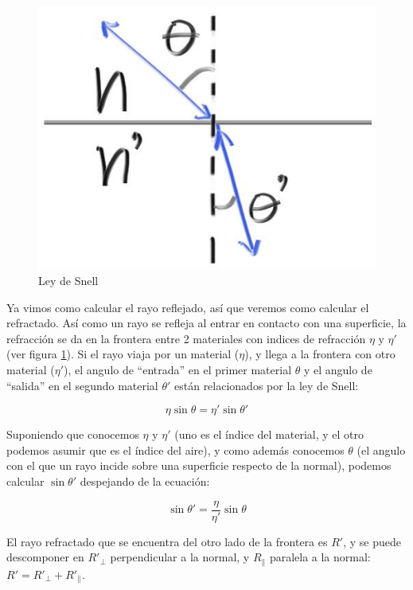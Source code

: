 \begin{figure}
    \centering
    \includegraphics[width=.7\textwidth]{imgs/refraction.jpg}
    \caption{Ley de Snell}
    \label{fig:snell-law}
\end{figure}

Ya vimos como calcular el rayo reflejado, así que veremos como calcular el
refractado. Así como un rayo se refleja al entrar en contacto con una
superficie, la refracción se da en la frontera entre 2 materiales con indices de
refracción $\eta$ y $\eta'$ (ver figura \ref{fig:snell-law}). Si el rayo viaja
por un material ($\eta$), y llega a la frontera con otro material ($\eta'$), el
angulo de ``entrada'' en el primer material $\theta$ y el angulo de ``salida'' en el
segundo material $\theta'$ están relacionados por la ley de Snell:

\[
    \eta \sin \theta = \eta' \sin \theta'
\]

Suponiendo que conocemos $\eta$ y $\eta'$ (uno es el índice del material, y el
otro podemos asumir que es el índice del aire), y como además conocemos $\theta$
(el angulo con el que un rayo incide sobre una superficie respecto de la
normal), podemos calcular $\sin \theta'$ despejando de la ecuación:

\[
    \sin \theta' = \frac{\eta}{\eta'} \sin \theta
\]

El rayo refractado que se encuentra del otro lado de la frontera es $R'$, y se
puede descomponer en $R'_{\perp}$ perpendicular a la normal, y
$R_{\parallel}$ paralela a la normal: $R' = R'_{\perp} + R'_{\parallel}$.
